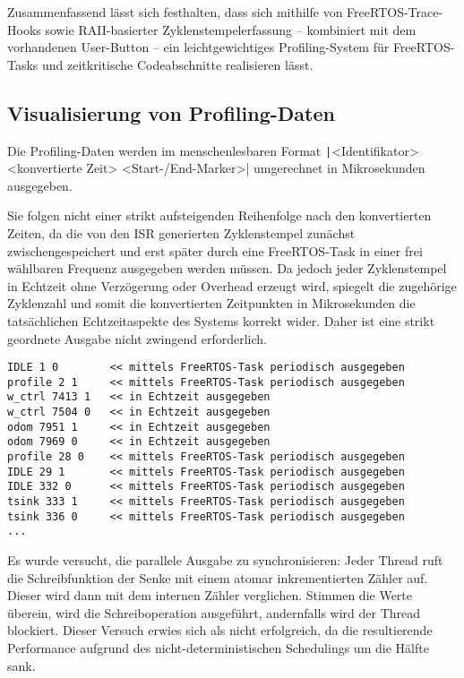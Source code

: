 Zusammenfassend lässt sich festhalten, dass sich mithilfe von
FreeRTOS-Trace-Hooks sowie RAII-basierter Zyklenstempelerfassung -- kombiniert
mit dem vorhandenen User-Button -- ein leichtgewichtiges Profiling-System für
FreeRTOS-Tasks und zeitkritische Codeabschnitte realisieren lässt.

\subsection{Visualisierung von Profiling-Daten}

Die Profiling-Daten werden im menschenlesbaren Format \linebreak
\texttt|<Identifikator> <konvertierte Zeit> <Start-/End-Marker>|
umgerechnet in Mikrosekunden ausgegeben.

Sie folgen nicht einer strikt aufsteigenden Reihenfolge nach den konvertierten
Zeiten, da die von den ISR generierten Zyklenstempel zunächst
zwischengespeichert und erst später durch eine FreeRTOS-Task in einer frei
wählbaren Frequenz ausgegeben werden müssen. Da jedoch jeder Zyklenstempel in
Echtzeit ohne Verzögerung oder Overhead erzeugt wird, spiegelt die zugehörige
Zyklenzahl und somit die konvertierten Zeitpunkten in Mikrosekunden die
tatsächlichen Echtzeitaspekte des Systems korrekt wider. Daher ist eine strikt
geordnete Ausgabe nicht zwingend erforderlich.

\begin{code}
\begin{verbatim}
IDLE 1 0        << mittels FreeRTOS-Task periodisch ausgegeben
profile 2 1     << mittels FreeRTOS-Task periodisch ausgegeben
w_ctrl 7413 1   << in Echtzeit ausgegeben
w_ctrl 7504 0   << in Echtzeit ausgegeben
odom 7951 1     << in Echtzeit ausgegeben
odom 7969 0     << in Echtzeit ausgegeben
profile 28 0    << mittels FreeRTOS-Task periodisch ausgegeben
IDLE 29 1       << mittels FreeRTOS-Task periodisch ausgegeben
IDLE 332 0      << mittels FreeRTOS-Task periodisch ausgegeben
tsink 333 1     << mittels FreeRTOS-Task periodisch ausgegeben
tsink 336 0     << mittels FreeRTOS-Task periodisch ausgegeben
...
\end{verbatim}
\end{code}

Es wurde versucht, die parallele Ausgabe zu synchronisieren: Jeder Thread ruft
die Schreibfunktion der Senke mit einem atomar inkrementierten Zähler auf.
Dieser wird dann mit dem internen Zähler verglichen. Stimmen die Werte überein,
wird die Schreiboperation ausgeführt, andernfalls wird der Thread blockiert.
Dieser Versuch erwies sich als nicht erfolgreich, da die resultierende
Performance aufgrund des nicht-deterministischen Schedulings um die Hälfte sank.

